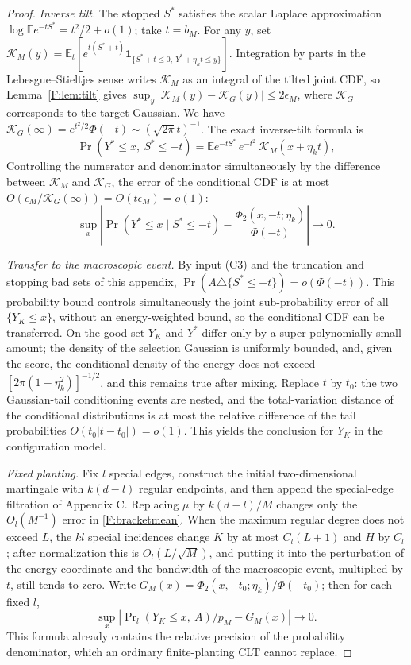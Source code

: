 \documentclass[a4paper,11pt]{article}
\numberwithin{equation}{section}
\newcommand{\E}{\mathbb E}
\begin{document}
\begin{proof}
\emph{Inverse tilt.} The stopped $S^*$ satisfies the scalar Laplace approximation
$\log\E e^{-tS^*}=t^2/2+o(1)$; take $t=b_M$. For any $y$, set
$\mathcal K_M(y)=\E_t[e^{t(S^*+t)}\mathbf1_{\{S^*+t\le0,\ Y^*+\eta_kt\le y\}}]$. Integration by parts in the
Lebesgue--Stieltjes sense writes $\mathcal K_M$ as an integral of the tilted joint CDF, so
Lemma~\ref{F:lem:tilt} gives $\sup_y|\mathcal K_M(y)-\mathcal K_G(y)|\le2\epsilon_M$, where $\mathcal K_G$
corresponds to the target Gaussian. We have
$\mathcal K_G(\infty)=e^{t^2/2}\Phi(-t)\sim(\sqrt{2\pi}t)^{-1}$. The exact inverse-tilt formula is
\[
\Pr(Y^*\le x,\ S^*\le-t)=\E e^{-tS^*}\,e^{-t^2}\,\mathcal K_M(x+\eta_kt),
\]
Controlling the numerator and denominator simultaneously by the difference between $\mathcal K_M$ and
$\mathcal K_G$, the error of the conditional CDF is at most
$O(\epsilon_M/\mathcal K_G(\infty))=O(t\epsilon_M)=o(1)$:
\[
\sup_x\left|\Pr(Y^*\le x\mid S^*\le-t)-\frac{\Phi_2(x,-t;\eta_k)}{\Phi(-t)}\right|\to0.
\]

\emph{Transfer to the macroscopic event.} By input (C3) and the truncation and stopping bad sets of this
appendix, $\Pr(A\triangle\{S^*\le-t\})=o(\Phi(-t))$. This probability bound controls simultaneously the joint
sub-probability error of all $\{Y_K\le x\}$, without an energy-weighted bound, so the conditional CDF can be
transferred. On the good set $Y_K$ and $Y^*$ differ only by a super-polynomially small amount; the density of
the selection Gaussian is uniformly bounded, and, given the score, the conditional density of the energy does
not exceed $[2\pi(1-\eta_k^2)]^{-1/2}$, and this remains true after mixing. Replace $t$ by $t_0$: the two
Gaussian-tail conditioning events are nested, and the total-variation distance of the conditional distributions
is at most the relative difference of the tail probabilities $O(t_0|t-t_0|)=o(1)$. This yields the conclusion
for $Y_K$ in the configuration model.

\emph{Fixed planting.} Fix $l$ special edges, construct the initial two-dimensional martingale with $k(d-l)$
regular endpoints, and then append the special-edge filtration of Appendix C. Replacing $\mu$ by $k(d-l)/M$
changes only the $O_l(M^{-1})$ error in \eqref{F:bracketmean}. When the maximum regular degree does not exceed
$L$, the $kl$ special incidences change $K$ by at most $C_l(L+1)$ and $H$ by $C_l$; after normalization this
is $O_l(L/\sqrt M)$, and putting it into the perturbation of the energy coordinate and the bandwidth of the
macroscopic event, multiplied by $t$, still tends to zero. Write
$G_M(x)=\Phi_2(x,-t_0;\eta_k)/\Phi(-t_0)$; then for each fixed $l$,
\begin{equation}
\sup_x\left|\Pr\nolimits_l(Y_K\le x,\ A)/p_M-G_M(x)\right|\to0.\label{F:plant}
\end{equation}
This formula already contains the relative precision of the probability denominator, which an ordinary
finite-planting CLT cannot replace.


\end{proof}
\end{document}
